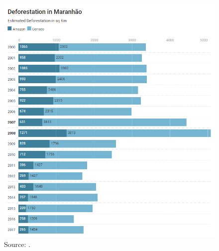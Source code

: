 \begin{figure}[H]
  \centering
  \includegraphics[width=1\textwidth, inner]{chartMA.png}
\caption{Source: \citep{MMMAwebsite}.}
\label{fig:defAmazonMA}
\end{figure}


